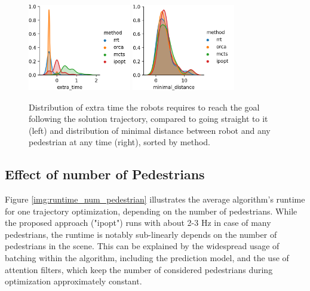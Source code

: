 \begin{figure}[!ht]
\begin{center}
\includegraphics[width=0.4\textwidth]{images/extra_time.png}
\includegraphics[width=0.4\textwidth]{images/minimal_distance.png}
\end{center}
\caption{Distribution of extra time the robots requires to reach the goal following the solution trajectory, compared to going straight to it (left) and distribution of minimal distance between robot and any pedestrian at any time (right), sorted by method.}
\label{img:extra_time_safety}
\end{figure}

\subsection{Effect of number of Pedestrians}
Figure \ref{img:runtime_num_pedestrian} illustrates the average algorithm's runtime for one trajectory optimization, depending on the number of pedestrians. While the proposed approach ("ipopt") runs with about 2-3 Hz in case of many pedestrians, the runtime is notably sub-linearly depends on the number of pedestrians in the scene. This can be explained by the widespread usage of batching within the algorithm, including the prediction model, and the use of attention filters, which keep the number of considered pedestrians during optimization approximately constant.

